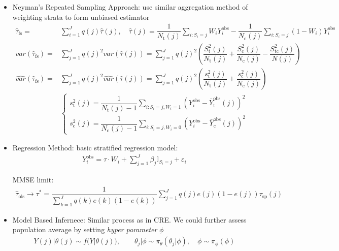 \begin{itemize}[topsep=2pt,itemsep=0pt]
    
    \item Neyman's Repeated Sampling Approach: use similar aggregation method of weighting strata to form unbiased estimator
    \begin{align}\label{EqaNeymanEstimatorStratified}
        \hat{\tau}_\mathrm{fs}=&\sum_{i=1}^Jq(j)\hat{\tau}(j),\quad \hat{\tau}(j)=\dfrac{1}{N_\mathrm{t}(j) }\sum_{i:S_i=j}W_iY_i^\mathrm{obs}- \dfrac{1}{N_\mathrm{c}(j) }\sum_{i:S_i=j}(1-W_i)Y_i^\mathrm{obs}\\
        var(\hat{\tau}_\mathrm{fs} )=&\sum_{j=1}^Jq(j)^2var\left(\hat{\tau}(j)\right)=\sum_{j=1}^J q(j)^2\left(\dfrac{S_\mathrm{t}^2(j) }{N_\mathrm{t}(j) }+\dfrac{S_\mathrm{c}^2(j) }{N_\mathrm{c}(j) }-\dfrac{S_\mathrm{tc}^2(j) }{N(j) }\right)\\
        \hat{var}(\hat{\tau}_\mathrm{fs} )=&\sum_{j=1}^Jq(j)^2\hat{var}\left(\hat{\tau}(j)\right)=\sum_{j=1}^J q(j)^2\left(\dfrac{s_\mathrm{t}^2(j) }{N_\mathrm{t}(j) }+\dfrac{s_\mathrm{c}^2(j) }{N_\mathrm{c}(j) }\right)\\
        &\begin{cases}
        s_\mathrm{t}^2(j)=\dfrac{1}{N_\mathrm{t} (j)-1}\sum_{i:S_i=j,W_i=1}(Y_i^\mathrm{obs}-\bar{Y}^\mathrm{obs}_\mathrm{t}(j))^2 \\
        s_\mathrm{c}^2(j)=\dfrac{1}{N_\mathrm{c} (j)-1}\sum_{i:S_i=j,W_i=0}(Y_i^\mathrm{obs}-\bar{Y}^\mathrm{obs}_\mathrm{c}(j))^2 
        \end{cases}
    \end{align}

    \item Regression Method: basic stratified regression model:
    \begin{align}
        Y_i^\mathrm{obs}=\tau\cdot W_i + \sum_{j=1}^J\beta _j \mathbb{I}_{S_i=j}+\varepsilon _i 
    \end{align}

    MMSE limit:
    \begin{align}
        \hat{\tau}_\mathrm{ols}\to \tau^*= \dfrac{1}{\sum_{k=1}^J q(k)e(k)(1-e(k))} \sum_{j=1}^Jq(j)e(j)(1-e(j))\tau_\mathrm{sp}(j) 
    \end{align}
    
    \item Model Based Infernece: Similar process as in CRE. We could further assess population average by setting \textit{hyper parameter} $ \phi  $
    \begin{align}
        Y(j)|\theta (j)\sim f(Y|\theta(j)),\qquad  \theta _j|\phi  \sim \pi_\theta (\theta _j|\phi ),\quad \phi \sim \pi_\phi (\phi )
    \end{align}
\end{itemize}

